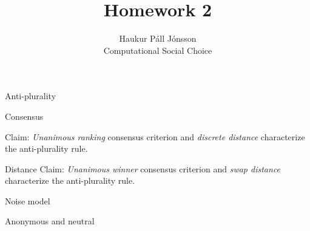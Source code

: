 \documentclass[12pt]{article}
\newenvironment{question}[2][Question]{\begin{trivlist}
\item[\hskip \labelsep {\bfseries #1}\hskip \labelsep {\bfseries #2.}]}{\end{trivlist}}
\newenvironment{answer}[2][Answer]{\begin{trivlist}
\item[\hskip \labelsep {\bfseries #1}\hskip \labelsep {\bfseries #2:}]}{\end{trivlist}}
\begin{document}
\renewcommand{\theenumi}{\roman{enumi}}

\let\oldsum\sum
\renewcommand{\sum}[3]{\oldsum\limits_{#1}^{#2}#3}
\let\oldprod\prod
\renewcommand{\prod}[3]{\oldprod\limits_{#1}^{#2}#3}

\newcommand\Dunion{
  \mathop{\mathchoice
    {\ooalign{$\displaystyle\bigcup$\cr\hss\scalebox{.65}{\raisebox{0.45ex}{\sffamily +}}\hss}}
    {\ooalign{$\textstyle\bigcup$\cr\hss\scalebox{.9}{\raisebox{0.5ex}{\tiny\sffamily +}}\hss}}
    {\ooalign{$\scriptstyle\bigcup$\cr\hss\scalebox{.45}{\raisebox{0.3ex}{\sffamily +}}\hss}}
    {\ooalign{$\scriptscriptstyle\bigcup$\cr\hss\scalebox{.38}{\raisebox{0.3ex}{\sffamily +}}\hss}}
    }
}

\title{Homework 2}
\author{Haukur Páll Jónsson\\
Computational Social Choice}

\maketitle

\begin{question}{1}{Anti-plurality}


\end{question}

\begin{answer}{a)}{Consensus}

Claim: \textit{Unanimous ranking} consensus criterion and \textit{discrete distance} characterize the anti-plurality rule.


\end{answer}

\begin{answer}{b)}{Distance}
Claim: \textit{Unanimous winner} consensus criterion and \textit{swap distance} characterize the anti-plurality rule.

\end{answer}

\begin{answer}{c)}{Noise model}


\end{answer}

\begin{question}{2}{Anonymous and neutral}

\end{question}
\end{document}
